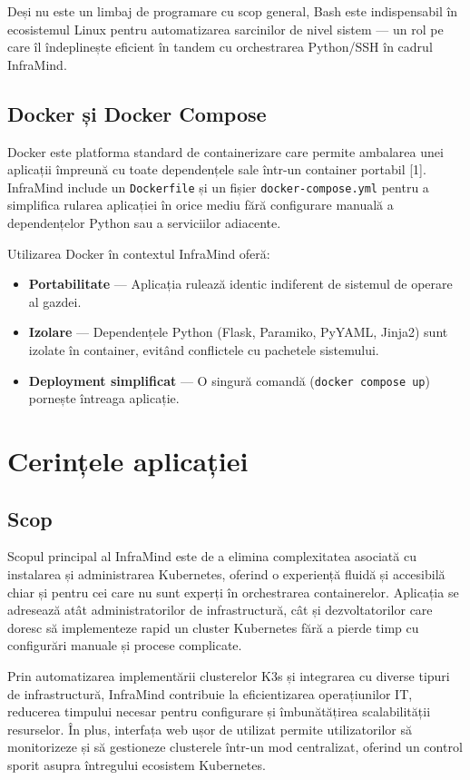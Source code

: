 \documentclass[12pt,a4paper]{report}
\begin{document}
Deși nu este un limbaj de programare cu scop general, Bash este indispensabil în ecosistemul Linux pentru automatizarea sarcinilor de nivel sistem — un rol pe care îl îndeplinește eficient în tandem cu orchestrarea Python/SSH în cadrul InfraMind.

\section{Docker și Docker Compose}

Docker este platforma standard de containerizare care permite ambalarea unei aplicații împreună cu toate dependențele sale într-un container portabil [1]. InfraMind include un \texttt{Dockerfile} și un fișier \texttt{docker-compose.yml} pentru a simplifica rularea aplicației în orice mediu fără configurare manuală a dependențelor Python sau a serviciilor adiacente.

Utilizarea Docker în contextul InfraMind oferă:

\begin{itemize}
  \item \textbf{Portabilitate} — Aplicația rulează identic indiferent de sistemul de operare al gazdei.
  \item \textbf{Izolare} — Dependențele Python (Flask, Paramiko, PyYAML, Jinja2) sunt izolate în container, evitând conflictele cu pachetele sistemului.
  \item \textbf{Deployment simplificat} — O singură comandă (\texttt{docker compose up}) pornește întreaga aplicație.
\end{itemize}

\chapter{Cerințele aplicației}
\label{cap:cerinte}
\section{Scop}

Scopul principal al InfraMind este de a elimina complexitatea asociată cu instalarea și administrarea Kubernetes, oferind o experiență fluidă și accesibilă chiar și pentru cei care nu sunt experți în orchestrarea containerelor. Aplicația se adresează atât administratorilor de infrastructură, cât și dezvoltatorilor care doresc să implementeze rapid un cluster Kubernetes fără a pierde timp cu configurări manuale și procese complicate.

Prin automatizarea implementării clusterelor K3s și integrarea cu diverse tipuri de infrastructură, InfraMind contribuie la eficientizarea operațiunilor IT, reducerea timpului necesar pentru configurare și îmbunătățirea scalabilității resurselor. În plus, interfața web ușor de utilizat permite utilizatorilor să monitorizeze și să gestioneze clusterele într-un mod centralizat, oferind un control sporit asupra întregului ecosistem Kubernetes.
\end{document}
